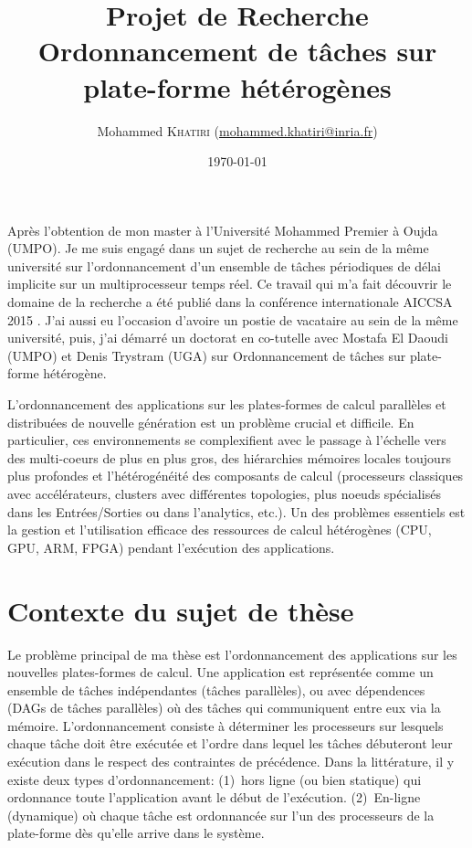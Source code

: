 \documentclass[11pt,final,french]{article}	%
\title{
	Projet de Recherche \\
	\large Ordonnancement de tâches sur plate-forme hétérogènes 
}
\author{
	Mohammed \textsc{Khatiri}
	({\small \href{mailto:mohammed.khatiri@inria.fr}{mohammed.khatiri@inria.fr}})
}
\date{\today}
\let\todoraw\todo
\renewcommand{\todo}[1]{\todoraw[inline]{#1}}
\begin{document}
\maketitle

\todo{ajouter résumé}





Après l'obtention de mon master à l'Université Mohammed Premier à Oujda (UMPO).
Je me suis engagé dans un sujet de recherche au sein de la même université sur l'ordonnancement
d'un ensemble de tâches périodiques de délai implicite sur un multiprocesseur temps réel.
Ce travail qui m'a fait découvrir le domaine de la recherche a été publié dans la conférence internationale 
AICCSA 2015 \cite{confDaoudiDKK15}.
J'ai aussi eu l'occasion d'avoire un postie de vacataire au sein de la même université,
puis, j'ai démarré un doctorat en co-tutelle avec Mostafa El Daoudi (UMPO) et Denis Trystram (UGA)
sur Ordonnancement de tâches sur plate-forme hétérogène.


L'ordonnancement des applications sur les plates-formes de calcul parall\`eles et distribu\'ees
de nouvelle g\'en\'eration est un probl\`eme crucial et difficile.
En particulier, ces environnements se complexifient avec le passage à l'\'echelle vers
des multi-coeurs de plus en plus gros, des hi\'erarchies m\'emoires locales toujours
plus profondes et l'h\'et\'erog\'en\'eit\'e des composants de calcul
(processeurs classiques avec acc\'el\'erateurs, clusters avec différentes topologies,
plus noeuds sp\'ecialis\'es dans les Entr\'ees/Sorties ou dans l'analytics, etc.).
Un des probl\`emes essentiels est la gestion et l'utilisation efficace
des ressources de calcul h\'et\'erog\`enes (CPU, GPU, ARM, FPGA) pendant l'exécution des applications. 

\section{Contexte du sujet de th\`ese}

Le problème principal de ma thèse est l'ordonnancement des applications
sur les nouvelles plates-formes de calcul.
Une application est représentée comme un ensemble de t\^aches ind\'ependantes (t\^aches parall\`eles),
ou avec d\'ependences (DAGs de tâches parallèles)
où des t\^aches qui communiquent entre eux via la m\'emoire.
L'ordonnancement consiste \`a d\'eterminer les processeurs sur lesquels
chaque t\^ache doit \^etre ex\'ecutée et l’ordre dans lequel les t\^aches d\'ebuteront
leur ex\'ecution dans le respect des contraintes de pr\'ec\'edence.
Dans la littérature, il y existe deux types d'ordonnancement: (1)~hors ligne (ou bien statique)
qui ordonnance toute l'application avant le d\'ebut de l'ex\'ecution.
(2)~En-ligne (dynamique) où chaque t\^ache est ordonnanc\'ee
sur l'un des processeurs de la plate-forme d\`es qu'elle arrive dans le syst\`eme.
\end{document}

